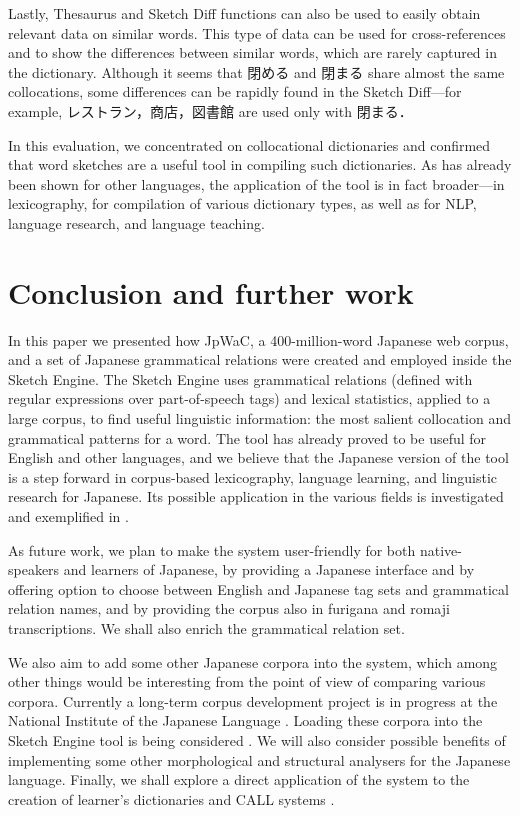 \documentclass[english]{jnlp_1.4}
\begin{document}
Lastly, Thesaurus and Sketch Diff functions can also be used to easily obtain relevant data on similar words. This type of data can be used for cross-references and to show the differences between similar words, which are rarely captured in the dictionary. Although it seems that 閉める and 閉まる share almost the same collocations, some differences can be rapidly found in the Sketch Diff---for example, レストラン，商店，図書館 are used only with 閉まる．

In this evaluation, we concentrated on collocational dictionaries and confirmed that word sketches are a useful tool in compiling such dictionaries. As has already been shown for other languages, the application of the tool is in fact broader---in lexicography, for compilation of various dictionary types, as well as for NLP, language research, and language teaching.



\section{Conclusion and further work}

In this paper we presented how JpWaC, a 400-million-word Japanese web corpus, and a set of Japanese grammatical relations were created and employed inside the Sketch Engine. The Sketch Engine uses grammatical relations (defined with regular expressions over part-of-speech tags) and lexical statistics, applied to a large corpus, to find useful linguistic information: the most salient collocation and grammatical patterns for a word. The tool has already proved to be useful for English and other languages, and we believe that the Japanese version of the tool is a step forward in corpus-based lexicography, language learning, and linguistic research for Japanese. Its possible application in the various fields is investigated and exemplified in . 

As future work, we plan to make the system user-friendly for both native-speakers and learners of Japanese, by providing a Japanese interface and by offering option to choose between English and Japanese tag sets and grammatical relation names, and by providing the corpus also in furigana and romaji transcriptions. We shall also enrich the grammatical relation set.

We also aim to add some other Japanese corpora into the system, which
among other things would be interesting from the point of view of
comparing various corpora. Currently a long-term corpus development
project is in progress at the National Institute of the Japanese
Language . Loading these corpora into the Sketch
Engine tool is being considered . We will also consider
possible benefits of implementing some other morphological and
structural analysers for the Japanese language. Finally, we shall
explore a direct application of the system to the creation of
learner's dictionaries  and CALL systems .
\end{document}

